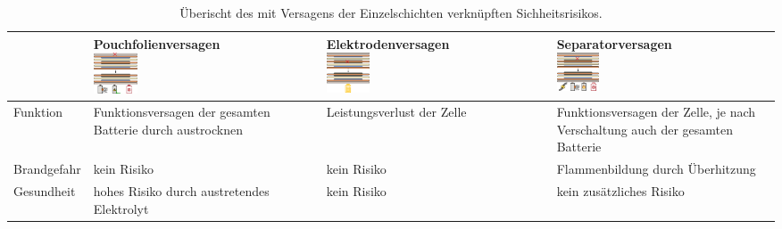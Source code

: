 \begin{table}[ht]
    \centering
    \caption{\label{tab:failure_modes}Überischt des mit Versagens der Einzelschichten verknüpften Sichheitsrisikos.}
    \begin{tabularx}{\textwidth}{lXXX}
    \toprule
    &\makecell{Pouchfolienversagen\\\includegraphics[width=0.2\textwidth]{failure_modes/failure_mode_pouch.png}}
    &\makecell{Elektrodenversagen\\\includegraphics[width=0.2\textwidth]{failure_modes/failure_mode_electrode.png}}
    &\makecell{Separatorversagen\\\includegraphics[width=0.2\textwidth]{failure_modes/failure_mode_separator.png}}
    \\
    \midrule
    Funktion
        & Funktionsversagen der gesamten Batterie durch austrocknen
        & Leistungsverlust der Zelle
        & Funktionsversagen der Zelle, je nach Verschaltung auch der gesamten Batterie
    \\
    Brandgefahr
        & kein Risiko
        & kein Risiko
        & Flammenbildung durch Überhitzung
    \\
    Gesundheit
        & hohes Risiko durch austretendes Elektrolyt
        & kein Risiko
        & kein zusätzliches Risiko
    \\
    \bottomrule
    \end{tabularx}\\
\end{table}%